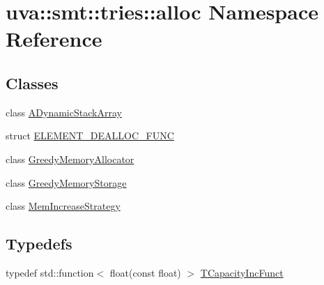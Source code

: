 \hypertarget{namespaceuva_1_1smt_1_1tries_1_1alloc}{}\section{uva\+:\+:smt\+:\+:tries\+:\+:alloc Namespace Reference}
\label{namespaceuva_1_1smt_1_1tries_1_1alloc}
\subsection*{Classes}
\begin{DoxyCompactItemize}
\item 
class \hyperlink{classuva_1_1smt_1_1tries_1_1alloc_1_1_a_dynamic_stack_array}{A\+Dynamic\+Stack\+Array}
\item 
struct \hyperlink{structuva_1_1smt_1_1tries_1_1alloc_1_1_e_l_e_m_e_n_t___d_e_a_l_l_o_c___f_u_n_c}{E\+L\+E\+M\+E\+N\+T\+\_\+\+D\+E\+A\+L\+L\+O\+C\+\_\+\+F\+U\+N\+C}
\item 
class \hyperlink{classuva_1_1smt_1_1tries_1_1alloc_1_1_greedy_memory_allocator}{Greedy\+Memory\+Allocator}
\item 
class \hyperlink{classuva_1_1smt_1_1tries_1_1alloc_1_1_greedy_memory_storage}{Greedy\+Memory\+Storage}
\item 
class \hyperlink{classuva_1_1smt_1_1tries_1_1alloc_1_1_mem_increase_strategy}{Mem\+Increase\+Strategy}
\end{DoxyCompactItemize}
\subsection*{Typedefs}
\begin{DoxyCompactItemize}
\item 
typedef std\+::function$<$ float(const float) $>$ \hyperlink{namespaceuva_1_1smt_1_1tries_1_1alloc_a3e6a48b58d6f09d775e523709e041d3c}{T\+Capacity\+Inc\+Funct}
\end{DoxyCompactItemize}
